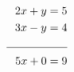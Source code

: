 \documentclass[preview]{standalone}
\begin{document}
\begin{align*}
2x+y = 5\\ 3x - y = 4 \\  \rule{1.9cm}{0.4pt} \\5x + 0 = 9
\end{align*}
\end{document}
